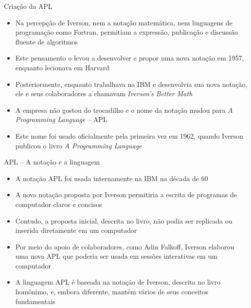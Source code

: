 \begin{frame}[fragile]{Criação da APL}

    \begin{itemize}
        \item Na percepção de Iverson, nem a notação matemática, nem linguagens de programação como Fortran, permitiam a expressão, publicação e discussão fluente de algoritmos 

        \item Este pensamento o levou a desenvolver e propor uma nova notação em 1957, enquanto lecionava em Harvard

        \item Posteriormente, enquanto trabalhava na IBM e desenvolvia sua nova notação, ele e seus colaboradores a chamavam \textit{Iverson's Better Math}

        \item A empresa não gostou do trocadilho e o nome da notação mudou para \textit{A Programming Language} -- APL

        \item Este nome foi usado oficialmente pela primeira vez em 1962, quando Iverson publicou o livro \textit{A Programming Language}
    \end{itemize}

\end{frame}

\begin{frame}[fragile]{APL -- A notação e a linguagem}

    \begin{itemize}
        \item A notação APL foi usada internamente na IBM na década de 60

        \item A nova notação proposta por Iverson permitiria a escrita de programas de computador claros e concisos

        \item Contudo, a proposta inicial, descrita no livro, não podia ser replicada ou inserida diretamente em um computador

        \item Por meio do apoio de colaboradores, como Adin Falkoff, Iverson elaborou uma nova APL que poderia ser usada em sessões interativas em um computador

        \item A linguagem APL é baseada na notação de Iverson, descrita no livro homônimo, e, embora diferente, mantém vários de seus conceitos fundamentais
    \end{itemize}

\end{frame}

